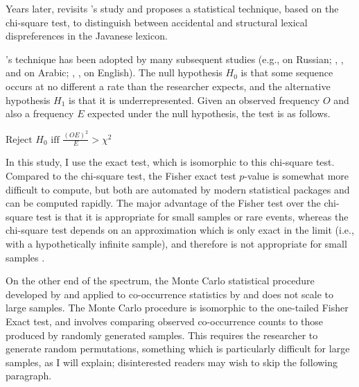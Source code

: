 \citet{McCarthy1988}

Years later, \citet{Mester1988} revisits \citeauthor{Uhlenbeck1950}'s study and proposes a statistical technique, based on the chi-square test, to distinguish between accidental and structural lexical dispreferences in the Javanese lexicon. 

\citeauthor{Mester1988}'s technique has been adopted by many subsequent studies (e.g., \citealt{Padgett1992,Padgett1995} on Russian; \citealt{Pierrehumbert1993}, \citealt{Frisch1996}, and \citealt{Frisch2004} on Arabic; \citealt{Berkley1994b,Berkley1994a,Berkley2000}, \citealt{Dmitrieva2008a}, \citealt{Dmitrieva2008b} on English). The null hypothesis $H_0$ is that some sequence occurs at no different a rate than the researcher expects, and the alternative hypothesis $H_1$ is that it is underrepresented. Given an observed frequency $O$ and also a frequency $E$ expected under the null hypothesis, the test is as follows.

\begin{example}
$\displaystyle \textrm{Reject } H_0 \textrm{ iff } \frac{(O E) ^ 2}{E} >
χ^2$
\end{example}

  
In this study, I use the \citet{Fisher1934} exact test, which is isomorphic to this chi-square test. Compared to the chi-square test, the Fisher exact test $p$-value is somewhat more difficult to compute, but both are automated by modern statistical packages and can be computed rapidly. The major advantage of the Fisher test over the chi-square test is that it is appropriate for small samples or rare events, whereas the chi-square test depends on an approximation which is only exact in the limit (i.e., with a hypothetically infinite sample), and therefore is not appropriate for small samples \citep[see][]{Gorman2012a}.

On the other end of the spectrum, the Monte Carlo statistical procedure developed by \citet{Kessler2001} and applied to co-occurrence statistics by \citet{Martin2007,Martin2011} and \citet{Brown2010} does not scale to large samples. The Monte Carlo procedure is isomorphic to the one-tailed Fisher Exact test, and involves comparing observed co-occurrence counts to those produced by randomly generated samples.  This requires the researcher to generate random permutations, something which is particularly difficult for large samples, as I will explain; disinterested readers may wish to skip the following paragraph.

